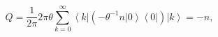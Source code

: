 \begin{equation}
Q=\frac{1}{2\pi}2\pi\theta\sum_{k=0}^{\infty}\left\langle k\right| \left(
-\theta^{-1}n\left| 0\right\rangle \left\langle 0\right| \right) \left|
k\right\rangle =-n, \label{Q3}%
\end{equation}

